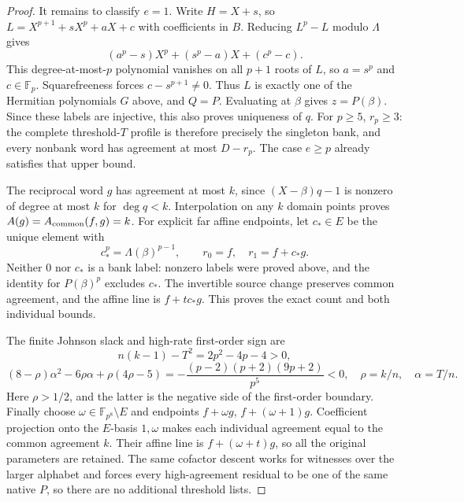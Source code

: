 \begin{proof}
It remains to classify $e=1$. Write $H=X+s$, so
$L=X^{p+1}+sX^p+aX+c$ with coefficients in $B$.
Reducing $L^p-L$ modulo $\Lambda$ gives
\[
 (a^p-s)X^p+(s^p-a)X+(c^p-c).
\]
This degree-at-most-$p$ polynomial vanishes on all $p+1$ roots of
$L$, so $a=s^p$ and $c\in\mathbb F_p$. Squarefreeness forces
$c-s^{p+1}\ne0$. Thus $L$ is exactly one of the Hermitian polynomials
$G$ above, and $Q=P$. Evaluating at $\beta$ gives $z=P(\beta)$.
Since these labels are injective, this also proves uniqueness of
$q$. For $p\ge5$, $r_p\ge3$: the complete threshold-$T$ profile is
therefore precisely the singleton bank, and every nonbank word has
agreement at most $D-r_p$. The case $e\ge p$ already satisfies
that upper bound.

The reciprocal word $g$ has agreement at most $k$, since
$(X-\beta)q-1$ is nonzero of degree at most $k$ for $\deg q<k$.
Interpolation on any $k$ domain points proves
$A(g)=A_{\rm common}(f,g)=k$. For explicit far affine endpoints,
let $c_*\in E$ be the unique element with
\[
 c_*^p=\Lambda(\beta)^{p-1},\qquad r_0=f,\quad r_1=f+c_*g.
\]
Neither $0$ nor $c_*$ is a bank label: nonzero labels were proved
above, and the identity for $P(\beta)^p$ excludes $c_*$.
The invertible source change preserves common agreement, and the
affine line is $f+t c_*g$. This proves the exact count and both
individual bounds.

The finite Johnson slack and high-rate first-order sign are
\[
 n(k-1)-T^2=2p^2-4p-4>0,
\]
\[
 (8-\rho)\alpha^2-6\rho\alpha+\rho(4\rho-5)
 =-\frac{(p-2)(p+2)(9p+2)}{p^5}<0,
 \quad \rho=k/n,\quad\alpha=T/n.
\]
Here $\rho>1/2$, and the latter is the negative side of the
first-order boundary. Finally choose
$\omega\in\mathbb F_{p^8}\setminus E$ and endpoints
$f+\omega g$, $f+(\omega+1)g$. Coefficient projection onto the
$E$-basis $1,\omega$ makes each individual agreement equal to the
common agreement $k$. Their affine line is $f+(\omega+t)g$, so
all the original parameters are retained. The same cofactor descent
works for witnesses over the larger alphabet and forces every high-agreement
residual to be one of the same native $P$, so there are no additional
threshold lists.
\end{proof}

